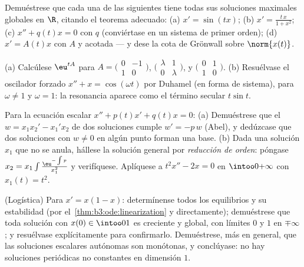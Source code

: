 \begin{exercise}[$\star\star$]\label{exo:b3:ode:3}
Demuéstrese que cada una de las siguientes tiene todas sus
soluciones maximales globales en $\R$,
citando el teorema adecuado:
(a) $x' = \sin(tx)$;
(b) $x' = \frac{t\,x}{1 + x^2}$;
(c) $x'' + q(t)x = 0$ con $q$
 (conviértase en un sistema
de primer orden); (d) $x' = A(t)x$ con $A$
 y acotada --- y dese la
cota de Grönwall sobre $\norm{x(t)}$.
\end{exercise}

\begin{exercise}[$\star\star$]\label{exo:b3:ode:4}
(a) Calcúlese $\eu^{tA}$ para
$A = \bigl(\begin{smallmatrix}0 & -1\\ 1 &
0\end{smallmatrix}\bigr)$,
$\bigl(\begin{smallmatrix}\lambda & 1\\ 0 &
\lambda\end{smallmatrix}\bigr)$, y
$\bigl(\begin{smallmatrix}0 & 1\\ 1 &
0\end{smallmatrix}\bigr)$.
(b) Resuélvase el oscilador forzado $x'' + x = \cos(\omega t)$ por
Duhamel (en forma de sistema), para $\omega \neq 1$ y $\omega =
1$: la resonancia aparece como el término secular $t\sin t$.
\end{exercise}

\begin{exercise}[$\star\star$]\label{exo:b3:ode:5}
Para la ecuación escalar $x'' + p(t)x' + q(t)x = 0$: (a) Demuéstrese que
el 
$w = x_1x_2' - x_1'x_2$ de dos soluciones cumple $w' = -p\,w$ (Abel), y
dedúzcase que dos soluciones con $w \neq 0$ en algún punto forman una
base. (b) Dada una solución $x_1$ que no se anula, hállese la solución
general por \emph{reducción de orden}: póngase $x_2 = x_1\int
\frac{\eu^{-\int p}}{x_1^2}$ y verifíquese. Aplíquese a $t^2x'' -
2x = 0$ en $\intoo0{+\infty}$ con $x_1(t) = t^2$.
\end{exercise}

\begin{exercise}[$\star\star$]\label{exo:b3:ode:6}
(Logística) Para $x' = x(1 - x)$: determínense todos los equilibrios y
su estabilidad (por el~\cref{thm:b3:ode:linearization} y directamente);
demuéstrese que toda solución con $x(0) \in \intoo01$ es creciente y
global, con límites $0$ y $1$ en $\mp\infty$; y resuélvase
explícitamente para confirmarlo. Demuéstrese, más en general, que las
soluciones escalares autónomas son monótonas, y conclúyase: no hay
soluciones periódicas no constantes en dimensión $1$.
\end{exercise}

